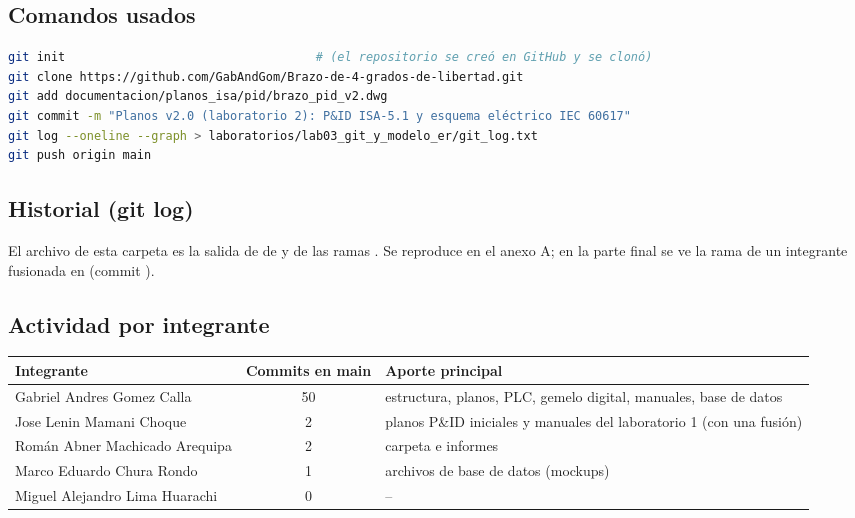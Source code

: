 \documentclass[a4paper,11pt]{article}
\begin{document}
\subsection{Comandos usados}
\begin{lstlisting}[language=bash]
git init                                   # (el repositorio se creó en GitHub y se clonó)
git clone https://github.com/GabAndGom/Brazo-de-4-grados-de-libertad.git
git add documentacion/planos_isa/pid/brazo_pid_v2.dwg
git commit -m "Planos v2.0 (laboratorio 2): P&ID ISA-5.1 y esquema eléctrico IEC 60617"
git log --oneline --graph > laboratorios/lab03_git_y_modelo_er/git_log.txt
git push origin main
\end{lstlisting}

\subsection{Historial (git log)}
El archivo  de esta carpeta es la salida de  de  y de las ramas . Se reproduce en el anexo A; en la parte final se ve la rama de un integrante fusionada en  (commit ).

\subsection{Actividad por integrante}
\begin{center}\small
\begin{tabular}{l c l}
\toprule
\textbf{Integrante} & \textbf{Commits en main} & \textbf{Aporte principal}\\
\midrule
Gabriel Andres Gomez Calla & 50 & estructura, planos, PLC, gemelo digital, manuales, base de datos\\
Jose Lenin Mamani Choque & 2 & planos P\&ID iniciales y manuales del laboratorio 1 (con una fusión)\\
Román Abner Machicado Arequipa & 2 & carpeta e informes\\
Marco Eduardo Chura Rondo & 1 & archivos de base de datos (mockups)\\
Miguel Alejandro Lima Huarachi & 0 & --\\
\bottomrule
\end{tabular}
\end{center}
\end{document}
